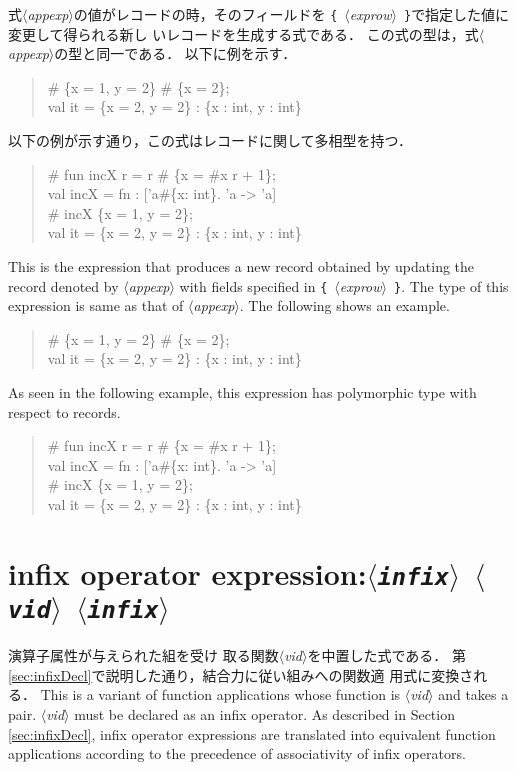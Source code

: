 \documentclass{jbook}
\newcommand{\txt}[2]{#2}
\newcommand{\nonterm}[1]{\mbox{$\langle$}{\it #1}\mbox{$\rangle$}}
\newcommand{\term}[1]{\mbox{{\tt #1}}}
\newenvironment{program}{\begin{quote}\begin{tt}}%
                        {\end{tt}\end{quote}}
\begin{document}
\ifjp%
	式\nonterm{appexp}の値がレコードの時，そのフィールドを
\term{\{}\ \nonterm{exprow}\ \term{\}}で指定した値に変更して得られる新し
いレコードを生成する式である．
	この式の型は，式\nonterm{appexp}の型と同一である．
	以下に例を示す．
\begin{program}
\# \{x = 1, y = 2\} \# \{x = 2\};
\\
val it = \{x = 2, y = 2\} : \{x : int, y : int\}
\end{program}
	以下の例が示す通り，この式はレコードに関して多相型を持つ．
\begin{program}
\# fun incX r = r \# \{x = \#x r + 1\};
\\
val incX = fn : ['a\#\{x: int\}. 'a -> 'a]
\\
\# incX \{x = 1, y = 2\};
\\
val it  = \{x = 2, y = 2\} : \{x : int, y : int\}
\end{program}
\else%
	This is the expression that produces a new record
obtained by updating the record denoted by \nonterm{appexp}
with fields specified in \term{\{}\ \nonterm{exprow}\ \term{\}}.
	The type of this expression is same as that
of \nonterm{appexp}.
	The following shows an example.
\begin{program}
\# \{x = 1, y = 2\} \# \{x = 2\};
\\
val it = \{x = 2, y = 2\} : \{x : int, y : int\}
\end{program}
	As seen in the following example, this expression has
polymorphic type with respect to records.
\begin{program}
\# fun incX r = r \# \{x = \#x r + 1\};
\\
val incX = fn : ['a\#\{x: int\}. 'a -> 'a]
\\
\# incX \{x = 1, y = 2\};
\\
val it  = \{x = 2, y = 2\} : \{x : int, y : int\}
\end{program}
\fi%

\section{\txt{演算子式}{infix operator expression}:\term{\nonterm{infix}\ \nonterm{vid} \nonterm{infix}}}

\ifjp%
	演算子属性が与えられた組を受け
取る関数\nonterm{vid}を中置した式である．
	第\ref{sec:infixDecl}で説明した通り，結合力に従い組みへの関数適
用式に変換される．
\else%
	This is a variant of function applications whose function is
\nonterm{vid} and takes a pair.
	\nonterm{vid} must be declared as an infix operator.
	As described in Section \ref{sec:infixDecl},
infix operator expressions are translated into equivalent
function applications according to the precedence of associativity
of infix operators.
\fi%
\end{document}
